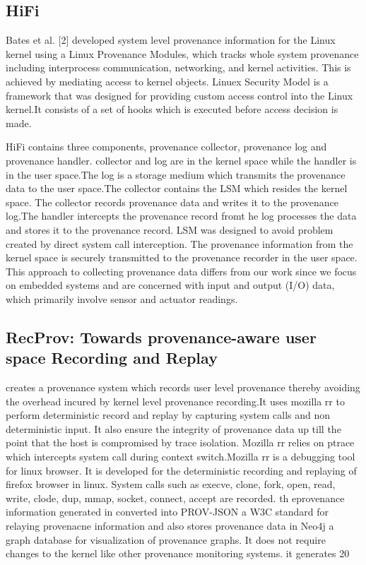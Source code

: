 \subsection{HiFi}
Bates et al. [2] developed system level provenance information for the Linux kernel using a Linux Provenance Modules, which tracks whole system provenance including interprocess communication, networking, and kernel activities. This is achieved by mediating access to kernel objects. Linuex Security Model is a framework that was designed for providing custom access control into the Linux kernel.It consists of a set of hooks which is executed before access decision is made.

HiFi contains three components, provenance collector, provenance log and provenance handler. collector and log are in the kernel space while the handler is in the user space.The log is a storage medium which transmits the provenance data to the user space.The collector contains the LSM which resides the kernel space. The collector records provenance data and writes it to the provenance log.The handler intercepts the provenance record fromt he log processes the data and stores it to the provenance record. LSM was designed to avoid problem created by direct system call interception. The provenance information from the kernel space is securely transmitted to the provenance recorder in the user space. This approach to collecting provenance data differs from our work since we focus on embedded systems and are concerned with input and output (I/O) data, which primarily involve sensor and actuator readings.

\subsection{RecProv: Towards provenance-aware user space Recording and Replay}

creates a provenance system which records user level provenance thereby avoiding the overhead incured by kernel level provenance recording.It uses mozilla rr to perform deterministic record and replay by capturing system calls  and non deterministic input. It also ensure the integrity of provenance data up till the point that the host is compromised by trace isolation. Mozilla rr relies on ptrace which intercepts system call during context switch.Mozilla rr is a debugging tool for linux browser. It is developed for the deterministic recording and replaying of firefox browser in linux. System calls such as execve, clone, fork, open, read, write, clode, dup, mmap, socket, connect, accept are recorded. th eprovenance information generated in converted into PROV-JSON a W3C standard for relaying provenacne information and also stores provenance data in Neo4j a graph database for visualization of provenance graphs. It does not require changes to the kernel like other provenance monitoring systems. it generates 20%


